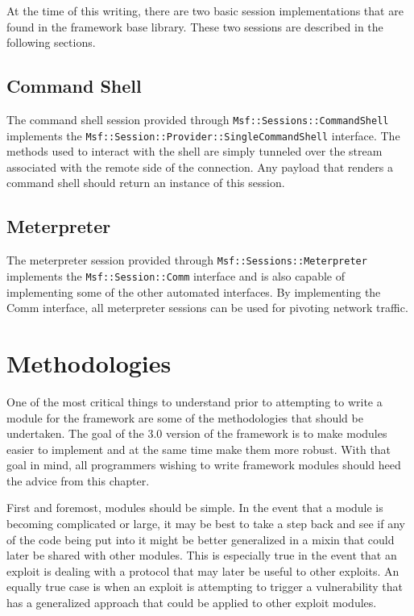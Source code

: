 \documentclass{report}
\begin{document}
\par
At the time of this writing, there are two basic session
implementations that are found in the framework base library.  These
two sessions are described in the following sections.

    \section{Command Shell}

\par
The command shell session provided through
\texttt{Msf::Sessions::CommandShell} implements the
\texttt{Msf::Session::Provider::SingleCommandShell} interface.  The
methods used to interact with the shell are simply tunneled over the
stream associated with the remote side of the connection.  Any
payload that renders a command shell should return an instance of
this session.

    \section{Meterpreter}

\par
The meterpreter session provided through
\texttt{Msf::Sessions::Meterpreter} implements the
\texttt{Msf::Session::Comm} interface and is also capable of
implementing some of the other automated interfaces.  By
implementing the Comm interface, all meterpreter sessions can be
used for pivoting network traffic.

\chapter{Methodologies}

\par
One of the most critical things to understand prior to attempting to
write a module for the framework are some of the methodologies that
should be undertaken.  The goal of the 3.0 version of the framework
is to make modules easier to implement and at the same time make
them more robust.  With that goal in mind, all programmers wishing
to write framework modules should heed the advice from this chapter.

\par
First and foremost, modules should be simple.  In the event that a
module is becoming complicated or large, it may be best to take a
step back and see if any of the code being put into it might be
better generalized in a mixin that could later be shared with other
modules.  This is especially true in the event that an exploit is
dealing with a protocol that may later be useful to other exploits.
An equally true case is when an exploit is attempting to trigger a
vulnerability that has a generalized approach that could be applied
to other exploit modules.
\end{document}
